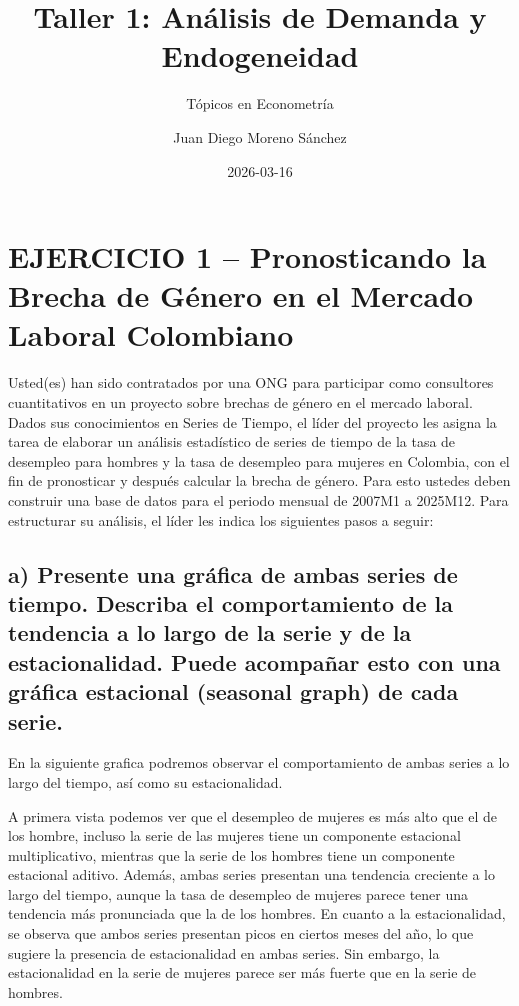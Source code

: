 \documentclass[
  11pt,
  letterpaper,
  DIV=11,
  numbers=noendperiod]{scrartcl}
\title{Taller 1: Análisis de Demanda y Endogeneidad}
\subtitle{Tópicos en Econometría}
\author{Juan Diego Moreno Sánchez}
\date{2026-03-16}
\begin{document}
\maketitle


\section{EJERCICIO 1 -- Pronosticando la Brecha de Género en el Mercado
Laboral
Colombiano}\label{ejercicio-1-pronosticando-la-brecha-de-guxe9nero-en-el-mercado-laboral-colombiano}

Usted(es) han sido contratados por una ONG para participar como
consultores cuantitativos en un proyecto sobre brechas de género en el
mercado laboral. Dados sus conocimientos en Series de Tiempo, el líder
del proyecto les asigna la tarea de elaborar un análisis estadístico de
series de tiempo de la tasa de desempleo para hombres y la tasa de
desempleo para mujeres en Colombia, con el fin de pronosticar y después
calcular la brecha de género. Para esto ustedes deben construir una base
de datos para el periodo mensual de 2007M1 a 2025M12. Para estructurar
su análisis, el líder les indica los siguientes pasos a seguir:

\subsection{a) Presente una gráfica de ambas series de tiempo. Describa
el comportamiento de la tendencia a lo largo de la serie y de la
estacionalidad. Puede acompañar esto con una gráfica estacional
(seasonal graph) de cada
serie.}\label{a-presente-una-gruxe1fica-de-ambas-series-de-tiempo.-describa-el-comportamiento-de-la-tendencia-a-lo-largo-de-la-serie-y-de-la-estacionalidad.-puede-acompauxf1ar-esto-con-una-gruxe1fica-estacional-seasonal-graph-de-cada-serie.}

En la siguiente grafica podremos observar el comportamiento de ambas
series a lo largo del tiempo, así como su estacionalidad.

A primera vista podemos ver que el desempleo de mujeres es más alto que
el de los hombre, incluso la serie de las mujeres tiene un componente
estacional multiplicativo, mientras que la serie de los hombres tiene un
componente estacional aditivo. Además, ambas series presentan una
tendencia creciente a lo largo del tiempo, aunque la tasa de desempleo
de mujeres parece tener una tendencia más pronunciada que la de los
hombres. En cuanto a la estacionalidad, se observa que ambos series
presentan picos en ciertos meses del año, lo que sugiere la presencia de
estacionalidad en ambas series. Sin embargo, la estacionalidad en la
serie de mujeres parece ser más fuerte que en la serie de hombres.
\end{document}
